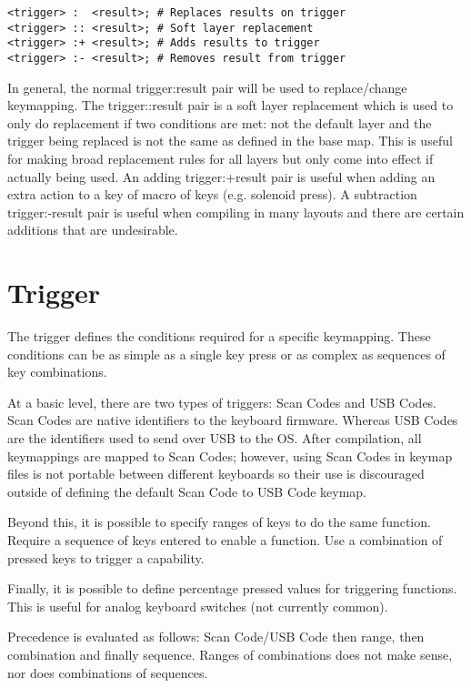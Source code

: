 \documentclass{kiibohd-template}
\begin{document}
\begin{lstlisting}
<trigger> :  <result>; # Replaces results on trigger
<trigger> :: <result>; # Soft layer replacement
<trigger> :+ <result>; # Adds results to trigger
<trigger> :- <result>; # Removes result from trigger
\end{lstlisting}

In general, the normal trigger:result pair will be used to replace/change keymapping.
The trigger::result pair is a soft layer replacement which is used to only do replacement if two conditions are met: not the default layer and the trigger being replaced is not the same as defined in the base map.
This is useful for making broad replacement rules for all layers but only come into effect if actually being used.
An adding trigger:+result pair is useful when adding an extra action to a key of macro of keys (e.g. solenoid press).
A subtraction trigger:-result pair is useful when compiling in many layouts and there are certain additions that are undesirable.


\section{Trigger}

The trigger defines the conditions required for a specific keymapping.
These conditions can be as simple as a single key press or as complex as sequences of key combinations.

At a basic level, there are two types of triggers: Scan Codes and USB Codes.
Scan Codes are native identifiers to the keyboard firmware.
Whereas USB Codes are the identifiers used to send over USB to the OS.
After compilation, all keymappings are mapped to Scan Codes; however, using Scan Codes in keymap files is not portable between different keyboards so their use is discouraged outside of defining the default Scan Code to USB Code keymap.

Beyond this, it is possible to specify ranges of keys to do the same function.
Require a sequence of keys entered to enable a function.
Use a combination of pressed keys to trigger a capability.

Finally, it is possible to define percentage pressed values for triggering functions.
This is useful for analog keyboard switches (not currently common).

Precedence is evaluated as follows: Scan Code/USB Code then range, then combination and finally sequence.
Ranges of combinations does not make sense, nor does combinations of sequences.
\end{document}
